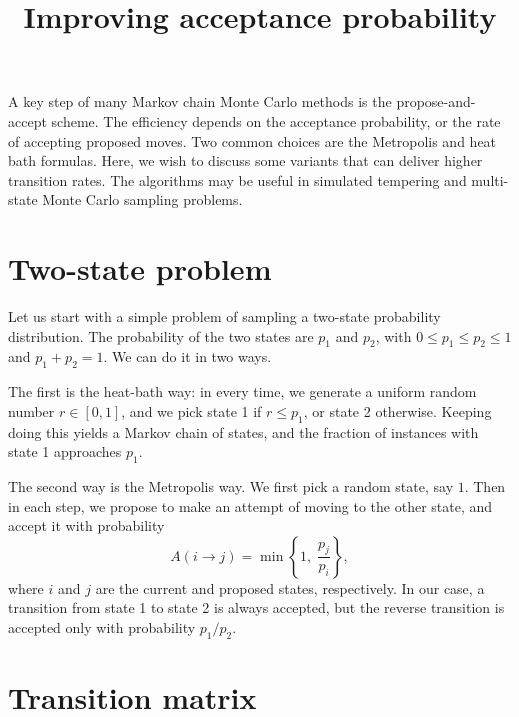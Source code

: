 \documentclass[12pt]{article}
\begin{document}
\title{Improving acceptance probability}
\author{ \vspace{-10ex} }
\date{ \vspace{-10ex} }
\maketitle


A key step of many Markov chain Monte Carlo methods
is the propose-and-accept scheme.
%
The efficiency depends on the acceptance probability,
or the rate of accepting proposed moves.
%
Two common choices are the Metropolis and heat bath formulas.
%
Here, we wish to discuss some variants
that can deliver higher transition rates.
%
The algorithms may be useful in simulated tempering
and multi-state Monte Carlo sampling problems.


\section{Two-state problem}

Let us start with a simple problem of
sampling a two-state probability distribution.
%
The probability of the two states are $p_1$ and $p_2$,
with $0 \le p_1 \le p_2 \le 1$ and $p_1 + p_2 = 1$.
%
We can do it in two ways.


The first is the heat-bath way:
in every time, we generate a uniform random number $r \in [0, 1]$,
and we pick state 1 if $r \le p_1$, or state 2 otherwise.
%
Keeping doing this yields a Markov chain of states,
and the fraction of instances with state 1 approaches $p_1$.

The second way is the Metropolis way.
We first pick a random state, say $1$.
Then in each step,
we propose to make an attempt of moving to the other state,
and accept it with probability
\begin{equation}
  A(i \rightarrow j) = \min\left\{1, \; \frac{ p_j } { p_i } \right\},
  \label{eq:AMetropolis}
\end{equation}
where $i$ and $j$ are the current and proposed states, respectively.
In our case, a transition from state 1 to state 2 is always accepted,
but the reverse transition is accepted
only with probability $p_1/p_2$.

\section{Transition matrix}
\end{document}
